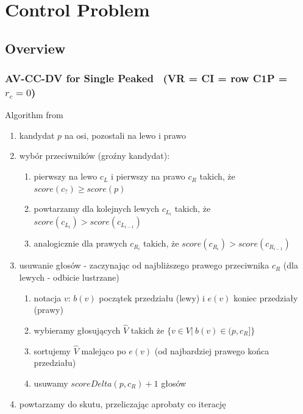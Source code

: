 
\chapter{Control Problem}  %

\ifpdf
    \graphicspath{{Chapter8/Figs/Raster/}{Chapter8/Figs/PDF/}{Chapter8/Figs/}}
\else
    \graphicspath{{Chapter8/Figs/Vector/}{Chapter8/Figs/}}
\fi


\section{Overview} %

\subsection{AV-CC-DV for Single Peaked ~(VR = CI = row C1P = $r_c=0$)}

Algorithm from \cite{control-sp-shield-faliszewski-hemaspaandra}

\begin{enumerate}
    \item kandydat $p$ na osi, pozostali na lewo i prawo
    \item wybór przeciwników (groźny kandydat): 
    \begin{enumerate}
        \item pierwszy na lewo $c_L$ i pierwszy na prawo $c_R$ takich, że $score(c_?) \geq score(p)$
        \item powtarzamy dla kolejnych lewych $c_{L_{i}}$ takich, że $score(c_{L_{i}}) > score(c_{L_{i-1}})$
        \item analogicznie dla prawych $c_{R_{i}}$ takich, że $score(c_{R_{i}}) > score(c_{R_{i-1}})$
    \end{enumerate}
    \item usuwanie głosów - zaczynając od najbliższego prawego przeciwnika $c_R$ (dla lewych - odbicie lustrzane)
    \begin{enumerate}
        \item notacja $v$: $b(v)$ początek przedziału (lewy) i $e(v)$ koniec przedziały (prawy)
        \item wybieramy głosujących $\widehat{V}$ takich że $\{v \in V | \: b(v) \in (p,c_R]\}$
        \item sortujemy $\widehat{V}$ malejąco po $e(v)$ (od najbardziej prawego końca przedziału)
        \item usuwamy $scoreDelta(p, c_R) + 1$ głosów
    \end{enumerate}
    \item powtarzamy do skutu, przeliczając aprobaty co iterację
\end{enumerate}


